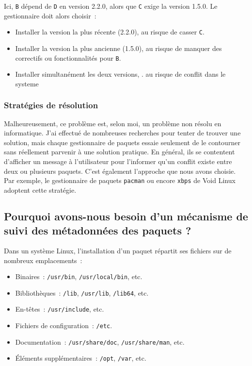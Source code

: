 Ici, \texttt{B} dépend de \texttt{D} en version 2.2.0, alors que \texttt{C} exige la version 1.5.0. Le gestionnaire doit alors choisir :

\begin{itemize}
  \item Installer la version la plus récente (2.2.0), au risque de casser \texttt{C}.
  \item Installer la version la plus ancienne (1.5.0), au risque de manquer des correctifs ou fonctionnalités pour \texttt{B}.
  \item Installer simultanément les deux versions, .  au risque de conflit dans le systeme
\end{itemize}

\subsubsection*{Stratégies de résolution}

Malheureusement, ce problème est, selon moi, un problème non résolu en informatique. J'ai effectué de nombreuses recherches pour tenter de trouver une solution, mais chaque gestionnaire de paquets essaie seulement de le contourner sans réellement parvenir à une solution pratique. En général, ils se contentent d'afficher un message à l'utilisateur pour l'informer qu’un conflit existe entre deux ou plusieurs paquets. C’est également l’approche que nous avons choisie. Par exemple, le gestionnaire de paquets \texttt{pacman} ou encore \texttt{xbps} de Void Linux adoptent cette stratégie.




\subsection{Pourquoi avons-nous besoin d’un mécanisme de suivi des métadonnées des paquets ?}
\label{subsec:suivi-fichiers}

Dans un système Linux, l’installation d’un paquet répartit ses fichiers sur de nombreux emplacements :
\begin{itemize}
  \item Binaires : \texttt{/usr/bin}, \texttt{/usr/local/bin}, etc.  
  \item Bibliothèques : \texttt{/lib}, \texttt{/usr/lib}, \texttt{/lib64}, etc.  
  \item En-têtes : \texttt{/usr/include}, etc.  
  \item Fichiers de configuration : \texttt{/etc}.  
  \item Documentation : \texttt{/usr/share/doc}, \texttt{/usr/share/man}, etc.  
  \item Éléments supplémentaires : \texttt{/opt}, \texttt{/var}, etc.  
\end{itemize}

